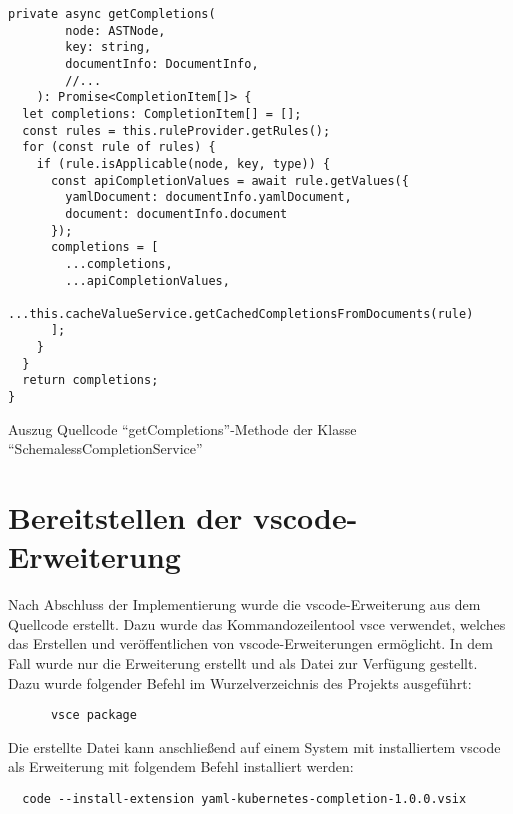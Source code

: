 \begin{listing}[t]
  \begin{verbatim}
private async getCompletions(
        node: ASTNode,
        key: string,
        documentInfo: DocumentInfo,
        //...
    ): Promise<CompletionItem[]> {
  let completions: CompletionItem[] = [];
  const rules = this.ruleProvider.getRules();
  for (const rule of rules) {
    if (rule.isApplicable(node, key, type)) {
      const apiCompletionValues = await rule.getValues({
        yamlDocument: documentInfo.yamlDocument,
        document: documentInfo.document
      });
      completions = [
        ...completions,
        ...apiCompletionValues,
        ...this.cacheValueService.getCachedCompletionsFromDocuments(rule)
      ];
    }
  }
  return completions;
}
      \end{verbatim}
  \caption{Auszug Quellcode ``getCompletions''-Methode der Klasse ``SchemalessCompletionService''}
  \label{lst:get-completions-schemaless-completion-service}
\end{listing}

\FloatBarrier

\section{Bereitstellen der \acs{vscode}-Erweiterung}

Nach Abschluss der Implementierung wurde die \acs{vscode}-Erweiterung aus dem Quellcode erstellt.
Dazu wurde das Kommandozeilentool \ac{vsce} verwendet, welches das Erstellen und veröffentlichen von
\acs{vscode}-Erweiterungen ermöglicht. In dem Fall wurde nur die Erweiterung erstellt und als
Datei zur Verfügung gestellt.
Dazu wurde folgender Befehl im Wurzelverzeichnis des Projekts ausgeführt:
\begin{verbatim}
      vsce package
\end{verbatim}
Die erstellte Datei kann anschließend auf einem System mit installiertem \ac{vscode} als
Erweiterung mit folgendem Befehl installiert werden:
\begin{verbatim}
  code --install-extension yaml-kubernetes-completion-1.0.0.vsix
\end{verbatim}

